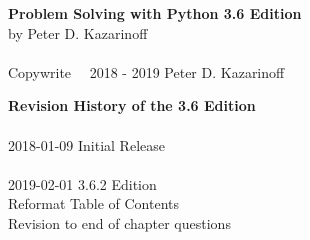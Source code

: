 
\textbf{Problem Solving with Python 3.6 Edition} \\
by Peter D. Kazarinoff \\
\\
Copywrite \  \textcopyright \  2018 - 2019 Peter D. Kazarinoff\\

\vspace{3in}

\textbf{Revision History of the 3.6 Edition}\\
\\
2018-01-09 Initial Release\\
\\
2019-02-01 3.6.2 Edition\\
Reformat Table of Contents\\
Revision to end of chapter questions